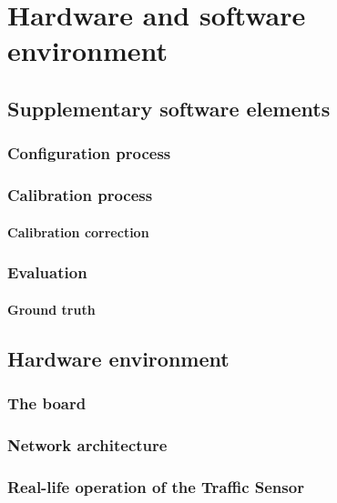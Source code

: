 \chapter{Hardware and software environment}\label{chap:Environment}
\section{Supplementary software elements}\label{sec:SupplementarySoftware}

\subsection{Configuration process}\label{subs:ProjectConfigurator}

\subsection{Calibration process}
\subsubsection{Calibration correction}

\subsection{Evaluation}
\subsubsection{Ground truth}
\section{Hardware environment}

\subsection{The board}
\subsection{Network architecture}
\subsection{Real-life operation of the Traffic Sensor}


